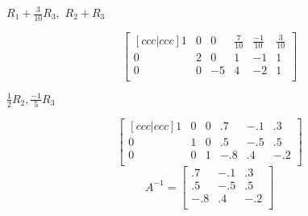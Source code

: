 \documentclass{article}
\begin{document}
$R_1+\frac{3}{10}R_3,$
$R_2 + R_3$

\[
\begin{bmatrix}[ccc|ccc]
    1& 0 & 0 & \frac{7}{10} & \frac{-1}{10} & \frac{3}{10}\\
    0 & 2 & 0 & 1 & -1 & 1\\
    0 & 0 & -5 & 4 & -2 & 1\\
  \end{bmatrix} 
\]

$\frac{1}{2}R_2, \frac{-1}{5}R_3$

\[
\begin{bmatrix}[ccc|ccc]
    1& 0 & 0 & .7 & -.1 & .3\\
    0 & 1 & 0 & .5 & -.5 & .5\\
    0 & 0 & 1 & -.8 & .4 & -.2\\
  \end{bmatrix} 
\]
\[
    A^{-1} =  
    \begin{bmatrix}
        .7 & -.1 & .3\\
        .5 & -.5 & .5\\
        -.8 & .4 & -.2\\
    \end{bmatrix}
\]
\end{document}
